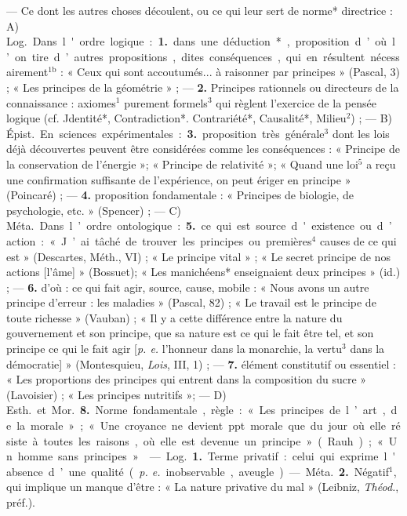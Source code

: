 \begin{itemize}[leftmargin=1cm, label=, itemsep=1pt]
 — Ce dont les autres choses
découlent, ou ce qui leur sert de
norme* directrice : A) \si{Log.} Dans
l'ordre logique : {\bf 1.} dans une déduction*, proposition d’où l’on tire
d’autres propositions, dites conséquences, qui en résultent nécessairement$^\text{1b}$ : « Ceux qui sont accoutumés... à raisonner par principes »
(Pascal, 3) ; « Les principes de la
géométrie » ; — {\bf 2.} Principes rationnels ou directeurs de la connaissance :
axiomes$^1$ purement formels$^3$ qui
règlent l'exercice de la pensée logique (cf. Jdentité*, Contradiction*.
Contrariété*, Causalité*, Milieu$^2$) ;
— B) \si{Épist.} En sciences expérimentales : {\bf 3.} proposition très générale$^3$
dont les lois déjà découvertes peuvent être considérées comme les
conséquences : « Principe de la conservation de l'énergie »; « Principe
de relativité »; « Quand une loi$^5$ a
reçu une confirmation suffisante de
l'expérience, on peut ériger en
principe » (Poincaré) ; — {\bf 4.} proposition fondamentale : « Principes
de biologie, de psychologie, etc. »
(Spencer) ; — C) \si{Méta.} Dans l’ordre
ontologique : {\bf 5.} ce qui est source
d'existence ou d’action : « J’ai tâché
de trouver les principes ou premières$^4$
causes de ce qui est » (Descartes,
Méth., VI) ; « Le principe vital » ;
« Le secret principe de nos actions
[l'âme] » (Bossuet); « Les manichéens* enseignaient deux principes »
(id.) ; — {\bf 6.} d'où : ce qui fait agir,
source, cause, mobile : « Nous avons
un autre principe d'erreur : les maladies » (Pascal, 82) ; « Le travail est
le principe de toute richesse » (Vauban) ; « Il y a cette différence entre
la nature du gouvernement et son
principe, que sa nature est ce qui le
fait être tel, et son principe ce qui le
fait agir [{\it p. e.} l'honneur dans la monarchie, la vertu$^3$ dans la démocratie] »
(Montesquieu, {\it Lois}, III, 1) ;
— {\bf 7.} élément constitutif ou essentiel : « Les proportions des principes
qui entrent dans la composition du
sucre » (Lavoisier) ; « Les principes
nutritifs »; — D) \si{Esth.} et \si{Mor.}
 {\bf 8.} Norme fondamentale, règle :
« Les principes de l’art, de la morale »; « Une croyance ne devient
ppt morale que du jour où elle
résiste à toutes les raisons, où elle
est devenue un principe » (Rauh) ;
« Un homme sans principes ».

 — \si{Log.} {\bf 1.} Terme privatif :
celui qui exprime l'absence d’une
qualité ({\it p. e.} inobservable, aveugle).
— \si{Méta.} {\bf 2.} Négatif$^1$, qui implique
un manque d’être : « La nature privative du mal » (Leibniz, {\it Théod.},
préf.).


\end{itemize}
